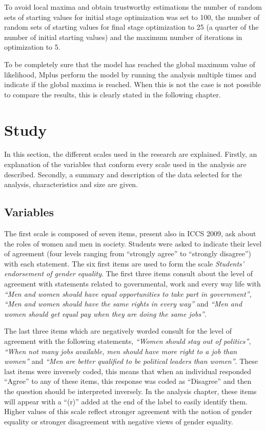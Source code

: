 \documentclass[12pt,a4paper,oneside]{reedthesis}
\begin{document}
To avoid local maxima and obtain trustworthy estimations the number of random sets of starting values for initial stage optimization was set to 100, the number of random sets of starting values for final stage optimization to 25 (a quarter of the number of initial starting values) and the maximum number of iterations in optimization to 5.

To be completely sure that the model has reached the global maximum value of likelihood, Mplus perform the model by running the analysis multiple times and indicate if the global maxima is reached. When this is not the case is not possible to compare the results, this is clearly stated in the following chapter.

\hypertarget{study}{%
\section{Study}\label{study}}

In this section, the different scales used in the research are explained. Firstly, an explanation of the variables that conform every scale used in the analysis are described. Secondly, a summary and description of the data selected for the analysis, characteristics and size are given.

\hypertarget{variables}{%
\subsection{Variables}\label{variables}}

The first scale is composed of seven items, present also in ICCS 2009, ask about the roles of women and men in society. Students were asked to indicate their level of agreement (four levels ranging from ``strongly agree'' to ``strongly disagree'') with each statement. The six first items are used to form the scale \emph{Students' endorsement of gender equality}. The first three items consult about the level of agreement with statements related to governmental, work and every way life with \emph{``Men and women should have equal opportunities to take part in government''}, \emph{``Men and women should have the same rights in every way''} and \emph{``Men and women should get equal pay when they are doing the same jobs''}.

The last three items which are negatively worded consult for the level of agreement with the following statements, \emph{``Women should stay out of politics''}, \emph{``When not many jobs available, men should have more right to a job than women''} and \emph{``Men are better qualified to be political leaders than women''}. These last items were inversely coded, this means that when an individual responded ``Agree'' to any of these items, this response was coded as ``Disagree'' and then the question should be interpreted inversely. In the analysis chapter, these items will appear with a ``(r)'' added at the end of the label to easily identify them. Higher values of this scale reflect stronger agreement with the notion of gender equality or stronger disagreement with negative views of gender equality.
\end{document}
